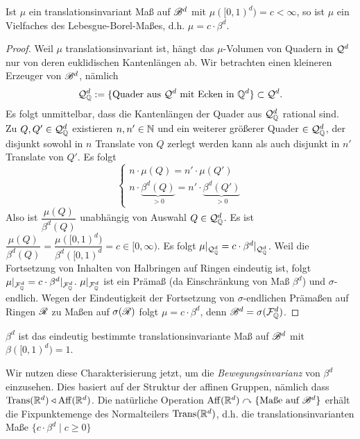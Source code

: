 \begin{satz}
\begin{mdframed}
Ist $\mu$ ein translationsinvariant Maß auf $\mathscr{B}^d$ mit $\mu([0,1)^d)=c<\infty$, so ist $\mu$ ein Vielfaches des Lebesgue-Borel-Maßes, d.h. $\mu=c\cdot \beta^d$.
\end{mdframed}
\begin{proof}
Weil $\mu$ translationsinvariant ist, hängt das $\mu$-Volumen von Quadern in $\mathcal{Q}^d$ nur von deren euklidischen Kantenlängen ab. Wir betrachten einen kleineren Erzeuger von $\mathscr{B}^d$, nämlich 
$$
\mathcal{Q}^d_{\mathbb{Q}} := \{ \text{Quader aus }\mathcal{Q}^d \text{ mit Ecken in } \mathbb{Q}^d\} \subset \mathcal{Q}^d.
$$
Es folgt unmittelbar, dass die Kantenlängen der Quader aus $\mathcal{Q}^d_{\mathbb{Q}}$ rational sind.\\
Zu $Q,Q' \in \mathcal{Q}^d_{\mathbb{Q}}$ existieren $n,n'\in\mathbb{N}$ und ein weiterer größerer Quader $\in \mathcal{Q}^d_{\mathbb{Q}}$, der disjunkt sowohl in $n$ Translate von $Q$ zerlegt werden kann als auch disjunkt in $n'$ Translate von $Q'$. Es folgt
\begin{equation*}
\begin{cases}
	n \cdot \mu(Q) = n' \cdot  \mu(Q') \\
	n \cdot \underbrace{\beta^d(Q)}_{>0} = n' \cdot \underbrace{\beta^d(Q')}_{>0}
\end{cases}
\end{equation*}
Also ist $\dfrac{\mu(Q)}{\beta^d(Q)}$ unabhängig von Auswahl $Q\in \mathcal{Q}^d_{\mathbb{Q}}$. Es ist $\dfrac{\mu(Q)}{\beta^d(Q)} = \dfrac{\mu([0,1)^d)}{\beta^d([0,1)^d} =c \in [0,\infty)$. Es folgt $\mu|_{\mathcal{Q}^d_{\mathbb{Q}}}= c \cdot \beta^d|_{\mathcal{Q}^d_{\mathbb{Q}}}$. Weil die Fortsetzung von Inhalten von Halbringen auf Ringen eindeutig ist, folgt $\mu|_{\mathcal{F}^d_{\mathbb{Q}}} = c \cdot \beta^d|_{\mathcal{F}^d_{\mathbb{Q}}}$. $\mu|_{\mathcal{F}^d_{\mathbb{Q}}}$ ist ein Prämaß (da Einschränkung von Maß $\beta^d$) und $\sigma$-endlich. Wegen der Eindeutigkeit der Fortsetzung von $\sigma$-endlichen Prämaßen auf Ringen $\mathscr{R}$ zu Maßen auf $\sigma(\mathscr{R})$ folgt $\mu = c \cdot \beta^d$, denn $\mathscr{B}^d=\sigma(\mathcal{F}^d_{\mathbb{Q}})$.
\end{proof}
\end{satz}

\begin{korollar}
\begin{mdframed}
$\beta^d$ ist das eindeutig bestimmte translationsinvariante Maß auf $\mathscr{B}^d$ mit $\beta([0,1)^d)=1$.
\end{mdframed}
\end{korollar}

Wir nutzen diese Charakterisierung jetzt, um die \emph{Bewegungsinvarianz} von $\beta^d$ einzusehen. Dies basiert auf der Struktur der affinen Gruppen, nämlich dass $\operatorname{Trans}(\mathbb{R}^d) \triangleleft \operatorname{Aff}(\mathbb{R}^d)$. Die natürliche Operation $\operatorname{Aff}(\mathbb{R}^d) \curvearrowright \{\text{Maße auf }\mathscr{B}^d\}$ erhält die Fixpunktemenge des Normalteilers $\operatorname{Trans}(\mathbb{R}^d)$, d.h. die translationsinvarianten Maße $\{c\cdot\beta^d \mid c\geq 0\}$

